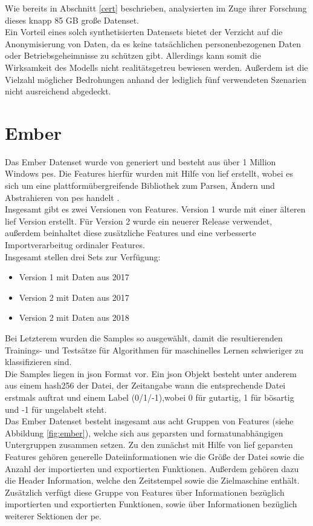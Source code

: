 \documentclass[
    12pt, %
    DIV10,
    ngerman, %
    a4paper, %
    oneside, %
    titlepage, %
    parskip=half, %
    headings=normal, %
    listof=totoc, %
    bibliography=totoc, %
    index=totoc, %
    captions=tableheading, %
    final %
]{scrreprt}
\begin{document}
Wie bereits in Abschnitt \ref{cert} beschrieben, analysierten \textcite{Le2019} im Zuge ihrer Forschung dieses knapp 85 GB große Datenset.\\
Ein Vorteil eines solch synthetisierten Datensets bietet der Verzicht auf die Anonymisierung von Daten, da es keine tatsächlichen personenbezogenen Daten oder Betriebsgeheimnisse zu schützen gibt. Allerdings kann somit die Wirksamkeit des Modells nicht realitätsgetreu bewiesen werden. Außerdem ist die Vielzahl möglicher Bedrohungen anhand der lediglich fünf verwendeten Szenarien nicht ausreichend abgedeckt.
\section{Ember}
Das Ember Datenset wurde von \textcite{anderson2018ember} generiert und besteht aus über 1 Million Windows \ac{pes}. Die Features hierfür wurden mit Hilfe von \ac{lief} erstellt, wobei es sich um eine plattformübergreifende Bibliothek zum Parsen, Ändern und Abstrahieren von \ac{pes} handelt \parencite{Quarkslab}.\\
Insgesamt gibt es zwei Versionen von Features. Version 1 wurde mit einer älteren \ac{lief} Version erstellt. Für Version 2 wurde ein neuerer Release verwendet, außerdem beinhaltet diese zusätzliche Features und eine verbesserte Importverarbeitug ordinaler Features.\\
Insgesamt stellen \citeauthor{anderson2018ember} drei Sets zur Verfügung:
\begin{itemize}
\item Version 1 mit Daten aus 2017
\item Version 2 mit Daten aus 2017
\item Version 2 mit Daten aus 2018
\end{itemize}
Bei Letzterem wurden die Samples so ausgewählt, damit die resultierenden Trainings- und Testsätze für Algorithmen für maschinelles Lernen schwieriger zu klassifizieren sind.\\
Die Samples liegen in \ac{json} Format vor. Ein \ac{json} Objekt besteht unter anderem aus einem hash256 der Datei, der Zeitangabe wann die entsprechende Datei erstmals auftrat und einem Label (0/1/-1),wobei 0 für gutartig, 1 für bösartig und -1 für ungelabelt steht.\\
Das Ember Datenset besteht insgesamt aus acht Gruppen von Features (siehe Abbildung \ref{fig:ember}), welche sich aus geparsten und formatunabhängigen Untergruppen zusammen setzen. Zu den zunächst mit Hilfe von \ac{lief} geparsten Features gehören generelle Dateiinformationen wie die Größe der Datei sowie die Anzahl der importierten und exportierten Funktionen. Außerdem gehören dazu die Header Information, welche den Zeitstempel sowie die Zielmaschine enthält. Zusätzlich verfügt diese Gruppe von Features über Informationen bezüglich importierten und exportierten Funktionen, sowie über Informationen bezüglich weiterer Sektionen der \ac{pe}.
\end{document}
